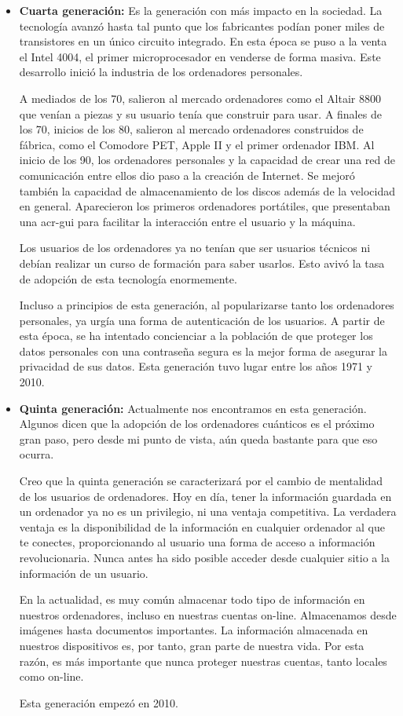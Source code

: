 \documentclass[twoside, titlepage, 12pt, a4paper]{article}
\begin{document}
\begin{itemize}
	\item{\textbf{Cuarta generación: }}Es la generación con más impacto en la sociedad. La tecnología avanzó hasta tal punto que los fabricantes podían poner miles de transistores en un único circuito integrado. En esta época se puso a la venta el Intel 4004, el primer microprocesador en venderse de forma masiva. Este desarrollo inició la industria de los ordenadores personales.\par A mediados de los 70, salieron al mercado ordenadores como el Altair 8800 que venían a piezas y su usuario tenía que construir para usar. A finales de los 70, inicios de los 80, salieron al mercado ordenadores construidos de fábrica, como el Comodore PET, Apple II y el primer ordenador IBM. Al inicio de los 90, los ordenadores personales y la capacidad de crear una red de comunicación entre ellos dio paso a la creación de Internet. Se mejoró también la capacidad de almacenamiento de los discos además de la velocidad en general. Aparecieron los primeros ordenadores portátiles, que presentaban una \gls{acr-gui} para facilitar la interacción entre el usuario y la máquina.\par Los usuarios de los ordenadores ya no tenían que ser usuarios técnicos ni debían realizar un curso de formación para saber usarlos. Esto avivó la tasa de adopción de esta tecnología enormemente.\par
		Incluso a principios de esta generación, al popularizarse tanto los ordenadores personales, ya urgía una forma de autenticación de los usuarios. A partir de esta época, se ha intentado concienciar a la población de que proteger los datos personales con una contraseña segura es la mejor forma de asegurar la privacidad de sus datos.
		Esta generación tuvo lugar entre los años 1971 y 2010. \par
	\item{\textbf{Quinta generación: }}Actualmente nos encontramos en esta generación. Algunos dicen que la adopción de los ordenadores cuánticos es el próximo gran paso, pero desde mi punto de vista, aún queda bastante para que eso ocurra.\par Creo que la quinta generación se caracterizará por el cambio de mentalidad de los usuarios de ordenadores. Hoy en día, tener la información guardada en un ordenador ya no es un privilegio, ni una ventaja competitiva. La verdadera ventaja es la disponibilidad de la información en cualquier ordenador al que te conectes, proporcionando al usuario una forma de acceso a información revolucionaria. Nunca antes ha sido posible acceder desde cualquier sitio a la información de un usuario. \par
		En la actualidad, es muy común almacenar todo tipo de información en nuestros ordenadores, incluso en nuestras cuentas on-line. Almacenamos desde imágenes hasta documentos importantes. La información almacenada en nuestros dispositivos es, por tanto, gran parte de nuestra vida. Por esta razón, es más importante que nunca proteger nuestras cuentas, tanto locales como on-line. \par
		Esta generación empezó en 2010.
\end{itemize} \par
\end{document}
